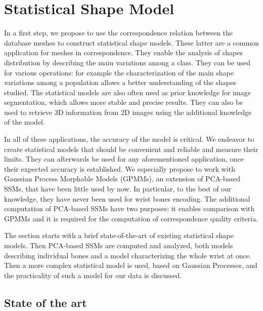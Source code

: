 \section{Statistical Shape Model}
\label{sec:5_SSM}

In a first step, we propose to use the correspondence relation between the database meshes to construct statistical shape models. These latter are a common application for meshes in correspondence. They enable the analysis of shapes distribution by describing the main variations among a class. They can be used for various operations: for example the characterization of the main shape variations among a population allows a better understanding of the shapes studied. The statistical models are also often used as prior knowledge for image segmentation, which allows more stable and precise results. They can also be used to retrieve 3D information from 2D images using the additional knowledge of the model. 

In all of these applications, the accuracy of the model is critical. We endeavor to create statistical models that should be convenient and reliable and measure their limits. They can afterwards be used for any aforementioned application, once their expected accuracy is established. 
We especially propose to work with Gaussian Process Morphable Models (GPMMs), an extension of PCA-based SSMs, that have been little used by now. In particular, to the best of our knowledge, they have never been used for wrist bones encoding. The additional computation of PCA-based SSMs have two purposes: it enables comparison with GPMMs and it is required for the computation of correspondence quality criteria. 

The section starts with a brief state-of-the-art of existing statistical shape models. Then PCA-based SSMs are computed and analyzed, both models describing individual bones and a model characterizing the whole wrist at once. Then a more complex statistical model is used, based on Gaussian Processes, and the practicality of such a model for our data is discussed. 

\subsection{State of the art}
\label{subsec:4_SSM_SoA}


